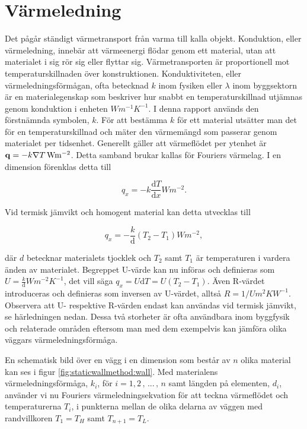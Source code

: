 \section{Värmeledning}
\label{sec:heatconduction}

Det pågår ständigt värmetransport från varma till kalla objekt. Konduktion, eller värmeledning, innebär att värmeenergi flödar genom ett material, utan att materialet i sig rör sig eller flyttar sig. Värmetransporten är proportionell mot temperaturskillnaden över konstruktionen. Konduktiviteten, eller värmeledningsförmågan, ofta betecknad $k$ inom fysiken eller $\lambda$ inom byggsektorn är en materialegenskap som beskriver hur snabbt en temperaturskillnad utjämnas genom konduktion i enheten $\unit{Wm^{-1}K^{-1}}$. I denna rapport används den förstnämnda symbolen, $k$. För att bestämma $k$ för ett material utsätter man det för en temperaturskillnad och mäter den värmemängd som passerar genom materialet per tidsenhet. Generellt gäller att värmeflödet per ytenhet är $\mathbf{q} = - \unit[k \nabla T]{Wm^{-2}}$. Detta samband brukar kallas för Fouriers värmelag. I en dimension förenklas detta till

\begin{equation}\label{eq:conduction:fourier}\boxed{ \; \; \;
q_x = -k \frac{\mathrm{d}T}{\mathrm{d}x} \unit{Wm^{-2}}.
\; \; \; }
\end{equation}

Vid termisk jämvikt och homogent material kan detta utvecklas till

\begin{equation}
q_x = -\frac{k}{\mathrm{d}}\left( T_2-T_1\right) \unit{Wm^{-2}},
\end{equation}

där $d$ betecknar materialets tjocklek och $T_2$ samt $T_1$ är temperaturen i vardera änden av materialet. Begreppet U-värde kan nu införas och definieras som $U = \frac{k}{\mathrm{d}} \unit{Wm^{-2}K^{-1}}$, det vill säga $q_x = U\mathrm{d}T = U\left( T_2-T_1 \right)$. Även R-värdet introduceras och definieras som inversen av U-värdet, alltså $R=1/U \unit{m^2KW^{-1}}$. Observera att U- respektive R-värden endast kan användas vid termisk jämvikt, se härledningen nedan. Dessa två storheter är ofta användbara inom byggfysik och relaterade områden eftersom man med dem exempelvis kan jämföra olika väggars värmeledningsförmåga.

En schematisk bild över en vägg i en dimension som består av $n$ olika material kan ses i figur \ref{fig:staticwallmethod:wall}. Med materialens värmeledningsförmåga, $k_i$, för $i=1,2\,,\,...\,,\,n$ samt längden på elementen, $d_i$, använder vi nu Fouriers värmeledningsekvation för att teckna värmeflödet och temperaturerna $T_i$, i punkterna mellan de olika delarna av väggen med randvillkoren $T_1 = T_H$ samt $T_{n+1} = T_L$.

